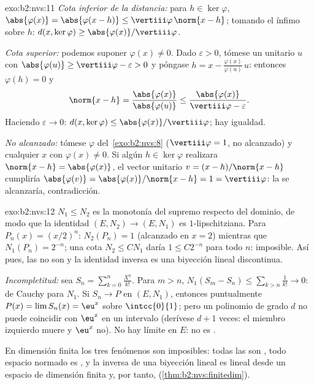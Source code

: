 \begin{solution}{exo:b2:nvs:11}
\emph{Cota inferior de la distancia:} para $h \in \ker\varphi$,
$\abs{\varphi(x)} = \abs{\varphi(x - h)} \leq
\vertiii\varphi\,\norm{x - h}$; tomando el ínfimo sobre $h$: $d(x,
\ker\varphi) \geq \abs{\varphi(x)}/\vertiii\varphi$.

\emph{Cota superior:} podemos suponer $\varphi(x) \neq 0$. Dado
$\varepsilon > 0$, tómese un unitario $u$ con $\abs{\varphi(u)} \geq
\vertiii\varphi - \varepsilon > 0$ y póngase $h = x -
\frac{\varphi(x)}{\varphi(u)}\,u$: entonces $\varphi(h) = 0$ y
\[
\norm{x - h} = \frac{\abs{\varphi(x)}}{\abs{\varphi(u)}}
\leq \frac{\abs{\varphi(x)}}{\vertiii\varphi - \varepsilon}.
\]
Haciendo $\varepsilon \to 0$: $d(x, \ker\varphi) \leq
\abs{\varphi(x)}/\vertiii\varphi$; hay igualdad.

\emph{No alcanzado:} tómese $\varphi$ del~\cref{exo:b2:nvs:8}
($\vertiii\varphi = 1$, no alcanzado) y cualquier $x$ con
$\varphi(x) \neq 0$. Si algún $h \in \ker\varphi$ realizara
$\norm{x - h} = \abs{\varphi(x)}$, el vector unitario $v = (x -
h)/\norm{x - h}$ cumpliría $\abs{\varphi(v)} =
\abs{\varphi(x)}/\norm{x - h} = 1 = \vertiii\varphi$: la
 se alcanzaría, contradicción.
\end{solution}

\begin{solution}{exo:b2:nvs:12}
$N_1 \leq N_2$ es la monotonía del supremo respecto del dominio, de
modo que la identidad $(E, N_2) \to (E, N_1)$ es $1$-lipschitziana.
Para $P_n(x) = (x/2)^n$: $N_2(P_n) = 1$ (alcanzado en $x = 2$)
mientras que $N_1(P_n) = 2^{-n}$; una cota $N_2 \leq CN_1$ daría $1
\leq C2^{-n}$ para todo $n$: imposible. Así pues, las  no son
 y la identidad inversa es una biyección lineal
discontinua.

\emph{Incompletitud:} sea $S_n = \sum_{k=0}^{n}\frac{X^k}{k!}$. Para
$m > n$, $N_1(S_m - S_n) \leq \sum_{k>n}\frac1{k!} \to 0$: de Cauchy
para $N_1$. Si $S_n \to P$ en $(E, N_1)$, entonces puntualmente
$P(x) = \lim S_n(x) = \eu^x$ sobre $\intcc{0}{1}$; pero un polinomio
de grado $d$ no puede coincidir con $\eu^x$ en un intervalo
(derívese $d + 1$ veces: el miembro izquierdo muere y $\eu^x$ no).
No hay límite en $E$: no es .

En dimensión finita los tres fenómenos son imposibles: todas las
 son , todo espacio normado es , y la
inversa de una biyección lineal es lineal desde un espacio de
dimensión finita y, por tanto, 
(\cref{thm:b2:nvs:finitedim}).
\end{solution}

